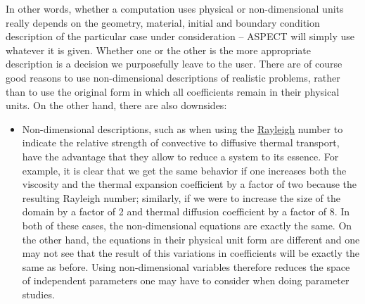 \documentclass{article}
\newcommand{\aspect}{\textsc{ASPECT}}
\begin{document}
In other words, whether a computation uses physical or non-dimensional units
really depends on the geometry, material, initial and boundary condition
description of the particular case under consideration -- \aspect{} will simply
use whatever it is given. Whether one or the other is the more appropriate
description is a decision we purposefully leave to the user. There are of
course good reasons to use non-dimensional descriptions of realistic problems,
rather than to use the original form in which all coefficients remain in their
physical units. On the other hand, there are also downsides:
\begin{itemize}
  \item Non-dimensional descriptions, such as when using the
  \href{http://en.wikipedia.org/wiki/Rayleigh_number}{Rayleigh} number to
  indicate the relative strength of convective to diffusive thermal transport,
  have the advantage that they allow to reduce a system to its essence. For
  example, it is clear that we get the same behavior if one increases both the
  viscosity and the thermal expansion coefficient by a factor of two because the
  resulting Rayleigh number; similarly, if we were to increase the size of the
  domain by a factor of 2 and thermal diffusion coefficient by a factor of 8. In both of
  these cases, the non-dimensional equations are exactly the same. On the other
  hand, the equations in their physical unit form are different and one may not
  see that the result of this variations in coefficients will be exactly the
  same as before. Using non-dimensional variables therefore reduces the space of
  independent parameters one may have to consider when doing parameter studies.


\end{itemize}
\end{document}
